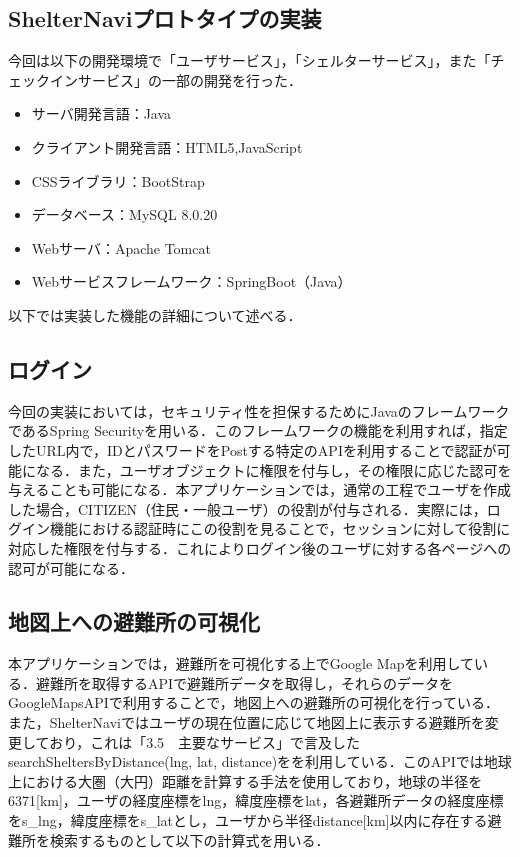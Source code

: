 \documentclass[technicalreport]{ieicej}
\begin{document}
\subsection{ShelterNaviプロトタイプの実装}
今回は以下の開発環境で「ユーザサービス」，「シェルターサービス」，また「チェックインサービス」の一部の開発を行った．
\begin{itemize}
    \item サーバ開発言語：Java
    \item クライアント開発言語：HTML5,JavaScript
    \item CSSライブラリ：BootStrap
    \item データベース：MySQL 8.0.20
    \item Webサーバ：Apache Tomcat
    \item Webサービスフレームワーク：SpringBoot（Java）
\end{itemize}
以下では実装した機能の詳細について述べる．

\subsection{ログイン}
今回の実装においては，セキュリティ性を担保するためにJavaのフレームワークであるSpring Securityを用いる．このフレームワークの機能を利用すれば，指定したURL内で，IDとパスワードをPostする特定のAPIを利用することで認証が可能になる．また，ユーザオブジェクトに権限を付与し，その権限に応じた認可を与えることも可能になる．本アプリケーションでは，通常の工程でユーザを作成した場合，CITIZEN（住民・一般ユーザ）の役割が付与される．実際には，ログイン機能における認証時にこの役割を見ることで，セッションに対して役割に対応した権限を付与する．これによりログイン後のユーザに対する各ページへの認可が可能になる．


\subsection{地図上への避難所の可視化}
本アプリケーションでは，避難所を可視化する上でGoogle Mapを利用している．避難所を取得するAPIで避難所データを取得し，それらのデータをGoogleMapsAPIで利用することで，地図上への避難所の可視化を行っている．また，ShelterNaviではユーザの現在位置に応じて地図上に表示する避難所を変更しており，これは「3.5　主要なサービス」で言及したsearchSheltersByDistance(lng, lat, distance)をを利用している．このAPIでは地球上における大圏（大円）距離を計算する手法を使用しており，地球の半径を6371[km]，ユーザの経度座標をlng，緯度座標をlat，各避難所データの経度座標をs\_lng，緯度座標をs\_latとし，ユーザから半径distance[km]以内に存在する避難所を検索するものとして以下の計算式を用いる．
\end{document}
